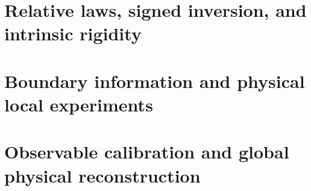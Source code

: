 \part{Relative laws, signed inversion, and intrinsic rigidity}





























\part{Boundary information and physical local experiments}



















\part{Observable calibration and global physical reconstruction}





